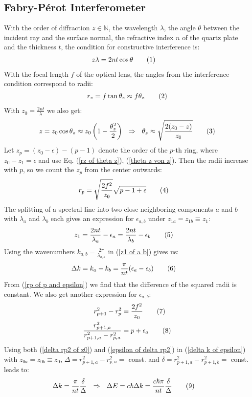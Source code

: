 \documentclass[a4paper,12pt]{article}
\newcommand\numberthis{\addtocounter{equation}{1}\tag{\theequation}}
\newcommand{\kla}{}
\begin{document}
\subsection{Fabry-Pérot Interferometer}
With the order of diffraction $z\in\mathbb{N}$, the wavelength $\lambda$, the angle $\theta$ between the incident ray and the surface normal, the refractive index $n$ of the quartz plate and the thickness $t$, the condition for constructive interference is:
\begin{align*}
z\lambda&=2nt\cos\theta\numberthis\label{z lambda ist 2nt cos theta}
\end{align*}
With the focal length $f$ of the optical lens, the angles from the interference condition correspond to radii:
\begin{align*}
r_z=f\tan\theta_z\approx f\theta_z\numberthis\label{rz of theta z}
\end{align*}
With $z_0=\frac{2nt}{\lambda}$ we also get:
\begin{align*}
z=z_0\cos\theta_z\approx z_0\kla\left( {1-\frac{\theta_z^2}{2}} \right)\ \ \Rightarrow\ \ \theta_z\approx\sqrt{\frac{2(z_0-z)}{z_0}}\numberthis\label{theta z von z}
\end{align*}
Let $z_p=(z_0-\epsilon) - (p-1)$ denote the order of the $p$-th ring, where $z_0-z_1=\epsilon$ and use Eq. (\ref{rz of theta z}), (\ref{theta z von z}). Then the radii increase with $p$, so we count the $z_p$ from the center outwards:
\begin{align*}
r_p&=\sqrt{\frac{2f^2}{z_0}}\sqrt{p-1+\epsilon}\numberthis\label{rp of p and epsilon}
\end{align*}
The splitting of a spectral line into two close neighboring components $a$ and $b$ with $\lambda_a$ and $\lambda_b$ each gives an expression for $\epsilon_{a,b}$ under $z_{1a}=z_{1b}\equiv z_1$:
\begin{align*}
z_1&=\frac{2nt}{\lambda_a}-\epsilon_a=\frac{2nt}{\lambda_b}-\epsilon_b\numberthis\label{z1 of a b}
\end{align*}
Using the wavenumbers $k_{a,b}=\frac{2\pi}{\lambda_{a,b}}$ in (\ref{z1 of a b}) gives us:
\begin{align*}
\Delta k&=k_a-k_b=\frac{\pi}{nt}(\epsilon_a-\epsilon_b)\numberthis\label{delta k of epsilon}
\end{align*}
From (\ref{rp of p and epsilon}) we find that the difference of the squared radii is constant. We also get another expression for $\epsilon_{a,b}$:
\begin{align*}
r_{p+1}^2-r_p^2&=\frac{2f^2}{z_0}\numberthis\label{delta rp2 of z0}\\
\frac{r_{p+1,a}^2}{r_{p+1,a}^2-r_{p,a}^2}&=p+\epsilon_{a}\numberthis\label{epsilon of delta rp2}
\end{align*}
Using both (\ref{delta rp2 of z0}) and (\ref{epsilon of delta rp2}) in (\ref{delta k of epsilon}) with $z_{0a}=z_{0b}\equiv z_0$, $\Delta=r_{p+1,a}^2-r_{p,a}^2=$ const. and $\delta=r_{p+1,a}^2-r_{p+1,b}^2=$ const. leads to:
\begin{align*}
\Delta k&=\frac{\pi}{nt}\frac{\delta}{\Delta}\ \ \Rightarrow\ \ \Delta E=c\hbar\Delta k=\frac{c\hbar\pi}{nt}\frac{\delta}{\Delta}\numberthis\label{Delta E von delta Delta}
\end{align*}
\end{document}
